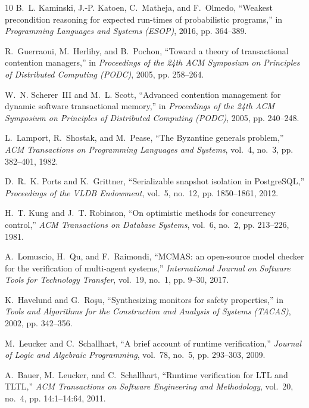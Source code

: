\documentclass[journal,compsoc,10pt]{IEEEtran}
\theoremstyle{definition}
\theoremstyle{remark}
\begin{document}
\begin{thebibliography}{10}
B.~L. Kaminski, J.-P. Katoen, C.~Matheja, and F.~Olmedo, ``Weakest
  precondition reasoning for expected run-times of probabilistic
  programs,'' in \emph{Programming Languages and Systems (ESOP)}, 2016,
  pp. 364--389.

R.~Guerraoui, M.~Herlihy, and B.~Pochon, ``Toward a theory of
  transactional contention managers,'' in \emph{Proceedings of the 24th
  ACM Symposium on Principles of Distributed Computing (PODC)}, 2005, pp.
  258--264.

W.~N. Scherer~III and M.~L. Scott, ``Advanced contention management for
  dynamic software transactional memory,'' in \emph{Proceedings of the
  24th ACM Symposium on Principles of Distributed Computing (PODC)}, 2005,
  pp. 240--248.

L.~Lamport, R.~Shostak, and M.~Pease, ``The {Byzantine} generals problem,''
  \emph{ACM Transactions on Programming Languages and Systems}, vol.~4,
  no.~3, pp. 382--401, 1982.

D.~R.~K. Ports and K.~Grittner, ``Serializable snapshot isolation in
  {PostgreSQL},'' \emph{Proceedings of the VLDB Endowment}, vol.~5, no.~12,
  pp. 1850--1861, 2012.

H.~T. Kung and J.~T. Robinson, ``On optimistic methods for concurrency
  control,'' \emph{ACM Transactions on Database Systems}, vol.~6, no.~2,
  pp. 213--226, 1981.

A.~Lomuscio, H.~Qu, and F.~Raimondi, ``{MCMAS}: an open-source model checker
  for the verification of multi-agent systems,'' \emph{International Journal
  on Software Tools for Technology Transfer}, vol.~19, no.~1, pp. 9--30, 2017.

K.~Havelund and G.~Ro\c{s}u, ``Synthesizing monitors for safety properties,''
  in \emph{Tools and Algorithms for the Construction and Analysis of Systems
  (TACAS)}, 2002, pp. 342--356.

M.~Leucker and C.~Schallhart, ``A brief account of runtime verification,''
  \emph{Journal of Logic and Algebraic Programming}, vol.~78, no.~5, pp.
  293--303, 2009.

A.~Bauer, M.~Leucker, and C.~Schallhart, ``Runtime verification for {LTL} and
  {TLTL},'' \emph{ACM Transactions on Software Engineering and Methodology},
  vol.~20, no.~4, pp. 14:1--14:64, 2011.


\end{thebibliography}
\end{document}
